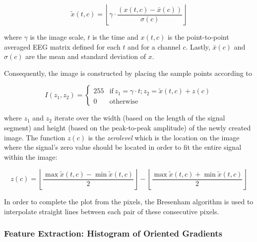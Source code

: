 \documentclass[entropy,article,submit,moreauthors,pdftex,10pt,a4paper]{mdpi}
\begin{document}
\begin{equation}
\tilde{x}(t,c) = \left \lfloor{ \gamma \cdot \frac{( x(t,c) - \bar{x}(c)  )}{ \sigma(c) } }\right \rfloor
\end{equation}

\noindent where $\gamma$ is the image scale, $t$ is the time and $ x(t,c) $ is the point-to-point averaged EEG matrix defined for each $t$ and for a channel $c$. Lastly, $\bar{x}(c)$ and $ \sigma (c) $ are the mean and standard deviation of $x$.

Consequently, the image is constructed by placing the sample points according to

\begin{equation}
I(z_1,z_2) = \left\{ \begin{array}{rl}
255 & \text{if} \,  z_1 = \gamma \cdot t; z_2 = \tilde{x}(t,c) + z(c) \\
0   & \mbox{otherwise}
\end{array}\right.
\label{eq:images}
\end{equation}

\noindent where $ z_1$ and $z_2$ iterate over the width (based on the length of the signal segment) and height (based on the peak-to-peak amplitude) of the newly created image.  The function $z(c)$ is the \textit{zerolevel} which is the location on the image where the signal's zero value should be located in order to fit the entire signal within the image:

\begin{equation}
z(c) = \left \lfloor{ \frac{\max \tilde{x}(t,c)  - \min \tilde{x}(t,c) }{2} }\right \rfloor -   \left \lfloor{ \frac{\max \tilde{x}(t,c)  + \min \tilde{x}(t,c)}{ 2} }\right \rfloor
\label{eq:zerolevel}
\end{equation}
  

In order to complete the plot from the pixels, the Bresenham \citep{Bresenham1965,Ramele2016} algorithm is used to interpolate straight lines between each pair of these consecutive pixels.


\subsubsection{Feature Extraction: Histogram of Oriented Gradients} \label{SIFT}

\end{document}
